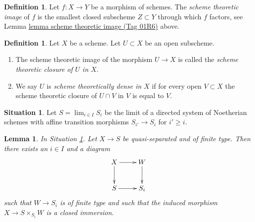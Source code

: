\documentclass{amsart}
\theoremstyle{plain}
\newtheorem{lemma}[subsection]{Lemma}
\theoremstyle{definition}
\newtheorem{definition}[subsection]{Definition}
\newtheorem{situation}[subsection]{Situation}
\theoremstyle{remark}
\numberwithin{equation}{subsection}
\def\lim{\mathop{\mathrm{lim}}\nolimits}
\begin{document}
\begin{definition}
\label{morphisms-definition-scheme-theoretic-image}
Let $f : X \to Y$ be a morphism of schemes. The {\it scheme theoretic image}
of $f$ is the smallest closed subscheme $Z \subset Y$ through which $f$
factors, see Lemma \href{https://stacks.math.columbia.edu/tag/01R6}{lemma scheme theoretic image (Tag 01R6)} above.
\end{definition}

\begin{definition}
\label{morphisms-definition-scheme-theoretically-dense}
Let $X$ be a scheme. Let $U \subset X$ be an open subscheme.
\begin{enumerate}
\item The scheme theoretic image of the morphism $U \to X$
is called the {\it scheme theoretic closure of $U$ in $X$}.
\item We say $U$ is {\it scheme theoretically dense in $X$}
if for every open $V \subset X$ the scheme theoretic closure
of $U \cap V$ in $V$ is equal to $V$.
\end{enumerate}
\end{definition}

\begin{situation}
\label{situation-limit-noetherian}
Let $S = \lim_{i \in I} S_i$ be the limit of a directed system of
Noetherian schemes with affine transition morphisms $S_{i'} \to S_i$
for $i' \geq i$.
\end{situation}

\begin{lemma}
\label{lemma-good-diagram}
In Situation \ref{situation-limit-noetherian}.
Let $X \to S$ be quasi-separated and of finite type.
Then there exists an $i \in I$ and a diagram
\begin{equation}
\label{equation-good-diagram}
\vcenter{
\xymatrix{
X \ar[r] \ar[d] & W \ar[d] \\
S \ar[r] & S_i
}
}
\end{equation}
such that $W \to S_i$ is of finite type and such that
the induced morphism $X \to S \times_{S_i} W$ is a closed
immersion.
\end{lemma}
\end{document}
